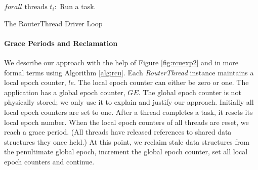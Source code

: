 \documentclass[a4paper]{article}
\begin{document}
\begin{algorithm}[float=tph]
\begin{algorithmic}
{
\STATE $forall \mbox{ threads }t_i:$
\STATE Run a task.
\ENDWHILE
}
\caption{The RouterThread Driver Loop}
\label{alg:driverloop}
\end{algorithmic}
\end{algorithm}

\paragraph{Grace Periods and Reclamation}
We describe our approach with the help of Figure \ref{fig:rcuexp2} and in more formal terms using Algorithm \ref{alg:rcu}. Each \emph{RouterThread} instance maintains a local epoch counter, $le$. The local epoch counter can either be zero or one. The application has a global epoch counter, $GE$. The global epoch counter is not physically stored; we only use it to explain and justify our approach. Initially all local epoch counters are set to one. After a thread completes a task, it resets its local epoch number. When the local epoch counters of all threads are reset, we reach a grace period. (All threads have released references to shared data structures they once held.) At this point, we reclaim stale data structures from the penultimate global epoch, increment the global epoch counter, set all local epoch counters and continue.
\end{document}
